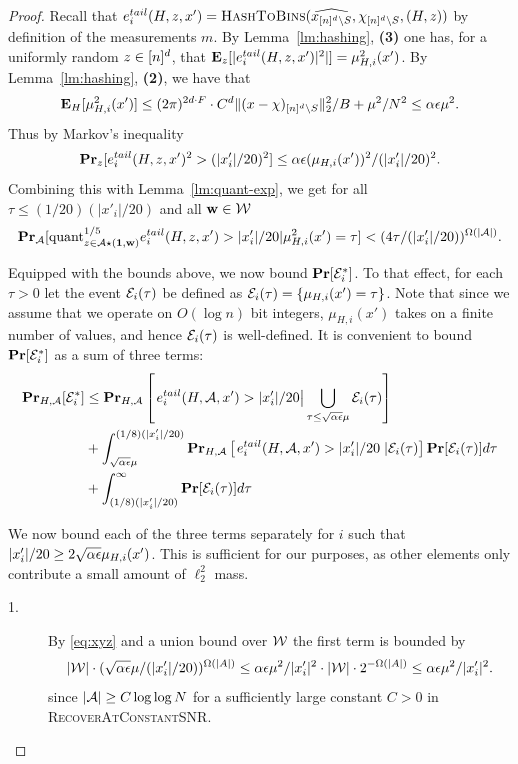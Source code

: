 \begin{proof}
Recall that $e^{tail}_i(H, z, x')=\Call{HashToBins}{\widehat{x_{\nsq\setminus S}}, \chi_{\nsq\setminus S}, (H, z)}$ by definition of the measurements $m$.  By Lemma~\ref{lm:hashing}, {\bf (3)} one has, for a uniformly random $z\in \nsq$, that 
$\expect_z[|e^{tail}_i(H, z, x')|^2|]=\mu_{H, i}^2(x')$. By Lemma~\ref{lm:hashing}, {\bf (2)}, we have that 
\begin{equation}\label{eq:expect-sigmaq}
\expect_H[\mu^2_{H, i}(x')] \leq  \GSS\cdot C^d \norm{2}{(x-\chi)_{\nsq\setminus S}}^2/B+\mu^2/N^2\leq  \alpha \e \mu^2.
\end{equation} 
Thus by Markov's inequality 
$$
\prob_{z}[e^{tail}_{i}(H, z, x')^2> (|x'_i|/20)^2]\leq \alpha\e (\mu_{H, i}(x'))^2/(|x'_i|/20)^2.
$$
Combining this with Lemma~\ref{lm:quant-exp}, we get for all $\tau\leq (1/20)(|x'_i|/20)$ and all $\h\in \H$
\begin{equation}\label{eq:xyz}
\prob_{\A}[\quant^{1/5}_{z\in \A\star (\one, \h)} e^{tail}_{i}(H, z, x')> |x'_i|/20| \mu_{H, i}^2(x')=\tau]<(4\tau/(|x'_i|/20))^{\Omega(|\A|)}.
\end{equation}


Equipped with the bounds above, we now bound $\prob[\E^*_i]$. To that effect, for each $\tau>0$ let the event $\E_i(\tau)$ be defined as 
$\E_i(\tau)=\{\mu_{H, i}(x')=\tau\}$. Note that since we assume that we operate on $O(\log n)$ bit integers, $\mu_{H, i}(x')$ takes on a finite number of values, and hence $\E_i(\tau)$ is well-defined. It is convenient to bound $\prob[\E_i^*]$ as a sum of three terms:
\begin{equation*}
\begin{split}
\prob_{H, \A}[\E^*_i]&\leq \prob_{H, \A}\left[\left.e^{tail}_{i}(H, \A, x')> |x'_i|/20\right|\bigcup_{\tau\leq \sqrt{\alpha \e}\mu}\E_i(\tau)\right] \\
&+\int_{\sqrt{\alpha \e}\mu}^{(1/8)(|x'_i|/20)} \prob_{H, \A}\left[\left.e^{tail}_{i}(H, \A, x')> |x'_i|/20\right.|\E_i(\tau)\right] \prob[\E_i(\tau)]d\tau\\
&+\int_{(1/8)(|x'_i|/20)}^\infty \prob[\E_i(\tau)]d\tau\\
\end{split}
\end{equation*}


We now bound each of the three terms separately for $i$ such that $|x'_i|/20\geq 2\sqrt{\alpha\e} \mu_{H, i}(x')$. This is sufficient for our purposes, as other elements only contribute a small amount of $\ell_2^2$ mass.
\begin{description}
\item[1.] By \eqref{eq:xyz} and a union bound over $\H$ the first term is bounded by 
\begin{equation}\label{eq:r-ub-1}
|\H|\cdot (\sqrt{\alpha \e}\mu/(|x'_i|/20))^{\Omega(|A|)}\leq \alpha \e \mu^2/|x'_i|^2\cdot |\H|\cdot 2^{-\Omega(|A|)}\leq \alpha\e \mu^2/|x'_i|^2.
\end{equation}
since $|\A|\geq C\log \log N$ for a sufficiently large constant $C>0$ in \textsc{RecoverAtConstantSNR}.


\end{description}
\end{proof}
